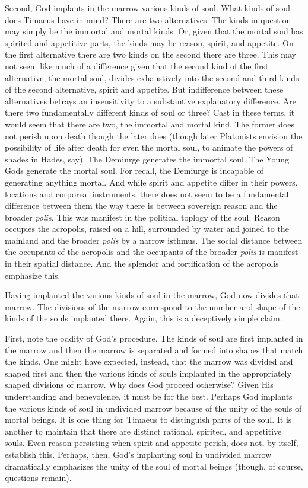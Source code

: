 Second, God implants in the marrow various kinds of soul. What kinds of soul does Timaeus have in mind? There are two alternatives. The kinds in question may simply be the immortal and mortal kinds. Or, given that the mortal soul has spirited and appetitive parts, the kinds may be reason, spirit, and appetite. On the first alternative there are two kinds on the second there are three. This may not seem like much of a difference given that the second kind of the first alternative, the mortal soul, divides exhaustively into the second and third kinds of the second alternative, spirit and appetite. But indifference between these alternatives betrays an insensitivity to a substantive explanatory difference. Are there two fundamentally different kinds of soul or three? Cast in these terms, it would seem that there are two, the immortal and mortal kind. The former does not perish upon death though the later does (though later Platonists envision the possibility of life after death for even the mortal soul, to animate the powers of shades in Hades, say). The Demiurge generates the immortal soul. The Young Gods generate the mortal soul. For recall, the Demiurge is incapable of generating anything mortal. And while spirit and appetite differ in their powers, locations and corporeal instruments, there does not seem to be a fundamental difference between them the way there is between sovereign reason and the broader \emph{polis}. This was manifest in the political toplogy of the soul. Reason occupies the acropolis, raised on a hill, surrounded by water and joined to the mainland and the broader \emph{polis} by a narrow isthmus. The social distance between the occupants of the acropolis and the occupants of the broader \emph{polis} is manifest in their spatial distance. And the splendor and fortification of the acropolis emphasize this. 

Having implanted the various kinds of soul in the marrow, God now divides that marrow. The divisions of the marrow correspond to the number and shape of the kinds of the souls implanted there. Again, this is a deceptively simple claim.

First, note the oddity of God's procedure. The kinds of soul are first implanted in the marrow and then the marrow is separated and formed into shapes that match the kinds. One might have expected, instead, that the marrow was divided and shaped first and then the various kinds of souls implanted in the appropriately shaped divisions of marrow. Why does God proceed otherwise? Given His understanding and benevolence, it must be for the best. Perhaps God implants the various kinds of soul in undivided marrow because of the unity of the souls of mortal beings. It is one thing for Timaeus to distinguish parts of the soul. It is another to maintain that there are distinct rational, spirited, and appetitive souls. Even reason persisting when spirit and appetite perish, does not, by itself, establish this. Perhaps, then, God's implanting soul in undivided marrow dramatically emphasizes the unity of the soul of mortal beings (though, of course, questions remain).

